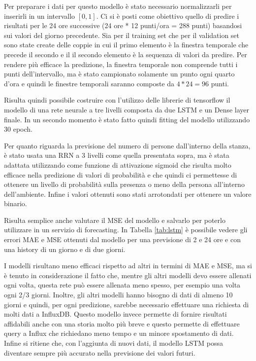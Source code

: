 \documentclass{article}
\begin{document}
Per preparare i dati per questo modello è stato necessario normalizzarli per inserirli in un intervallo $[0,1]$. Ci si è posti come obiettivo quello di predire i risultati per le 24 ore successive (24 ore * 12 punti/ora = 288 punti) basandosi sui valori del giorno precedente. Sia per il training set che per il validation set sono state create delle coppie in cui il primo elemento è la finestra temporale che precede il secondo e il il secondo elemento è la sequenza di valori da predire. Per rendere più efficace la predizione, la finestra temporale non comprende tutti i punti dell'intervallo, ma è stato campionato solamente un punto ogni quarto d'ora e quindi le finestre temporali saranno composte da $4*24=96$ punti.

Risulta quindi possibile costruire con l'utilizzo delle librerie di tensorflow il modello di una rete neurale a tre livelli composta da due LSTM e un Dense layer finale.
In un secondo momento è stato fatto quindi fitting del modello utilizzando 30 epoch. 

Per quanto riguarda la previsione del numero di persone dall'interno della stanza, è stato usata una RRN a 3 livelli come quella presentata sopra, ma è stata adattata utilizzando come funzione di attivazione sigmoid che risulta molto efficace nella predizione di valori di probabilità e che quindi ci permettesse di ottenere un livello di probabilità sulla presenza o meno della persona all'interno dell'ambiente. Infine i valori ottenuti sono stati arrotondati per ottenere un valore binario.

Risulta semplice anche valutare il MSE del modello e salvarlo per poterlo utilizzare in un servizio di forecasting. 
In Tabella \ref{tab:lstm} è possibile vedere gli errori MAE e MSE ottenuti dal modello per una previsione di 2 e 24 ore e con una history di un giorno e di due giorni.

I modelli risultano meno efficaci rispetto ad altri in termini di MAE e MSE, ma si è tenuto in considerazione il fatto che, mentre gli altri modelli devo essere allenati ogni volta, questa rete può essere allenata meno spesso, per esempio una volta ogni 2/3 giorni. Inoltre, gli altri modelli hanno bisogno di dati di almeno 10 giorni e quindi, per ogni predizione, sarebbe necessario effettuare una richiesta di molti dati a InfluxDB. Questo modello invece permette di fornire risultati affidabili anche con una storia molto più breve e questo permette di effettuare query a Influx che richiedano meno tempo e un minore spostamento di dati.
Infine si ritiene che, con l'aggiunta di nuovi dati, il modello LSTM possa diventare sempre più accurato nella previsione dei valori futuri.
\end{document}
